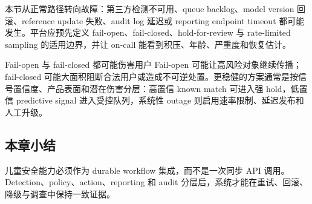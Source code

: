本节从正常路径转向故障：第三方检测不可用、queue backlog、model version 回滚、reference update 失败、audit log 延迟或 reporting endpoint timeout 都可能发生。平台应预先定义 fail-open、fail-closed、hold-for-review 与 rate-limited sampling 的适用边界，并让 on-call 能看到积压、年龄、严重度和恢复估计。

\begin{warningbox}{Fail-open 与 fail-closed 都可能伤害用户}
Fail-open 可能让高风险对象继续传播；fail-closed 可能大面积阻断合法用户或造成不可逆处置。更稳健的方案通常是按信号置信度、产品表面和潜在伤害分层：高置信 known match 可进入强 hold，低置信 predictive signal 进入受控队列，系统性 outage 则启用速率限制、延迟发布和人工升级。
\end{warningbox}


\subsection{本章小结}

儿童安全能力必须作为 durable workflow 集成，而不是一次同步 API 调用。Detection、policy、action、reporting 和 audit 分层后，系统才能在重试、回滚、降级与调查中保持一致证据。


